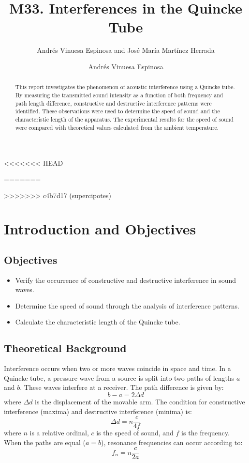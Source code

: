 \documentclass[a4paper,11pt]{article}
\begin{document}
\title{M33. Interferences in the Quincke Tube}
<<<<<<< HEAD
\author{Andrés Vinuesa Espinosa and José María Martínez Herrada}
=======
\author{Andrés Vinuesa Espinosa}
>>>>>>> c4b7d17 (supercipotes)
\maketitle

\begin{abstract}
This report investigates the phenomenon of acoustic interference using a Quincke tube. By measuring the transmitted sound intensity as a function of both frequency and path length difference, constructive and destructive interference patterns were identified. These observations were used to determine the speed of sound and the characteristic length of the apparatus. The experimental results for the speed of sound were compared with theoretical values calculated from the ambient temperature.
\end{abstract}

\section{Introduction and Objectives}

\subsection{Objectives}
\begin{itemize}
    \item Verify the occurrence of constructive and destructive interference in sound waves.
    \item Determine the speed of sound through the analysis of interference patterns.
    \item Calculate the characteristic length of the Quincke tube.
\end{itemize}

\subsection{Theoretical Background}
Interference occurs when two or more waves coincide in space and time. In a Quincke tube, a pressure wave from a source is split into two paths of lengths $a$ and $b$. These waves interfere at a receiver. The path difference is given by:
\begin{equation}
    b - a = 2\Delta d
\end{equation}
where $\Delta d$ is the displacement of the movable arm. The condition for constructive interference (maxima) and destructive interference (minima) is:
\begin{equation}
    \Delta d = n \frac{c}{4f}
\end{equation}
where $n$ is a relative ordinal, $c$ is the speed of sound, and $f$ is the frequency. When the paths are equal ($a=b$), resonance frequencies can occur according to:
\begin{equation}
    f_n = n \frac{c}{2a}
\end{equation}
\end{document}
